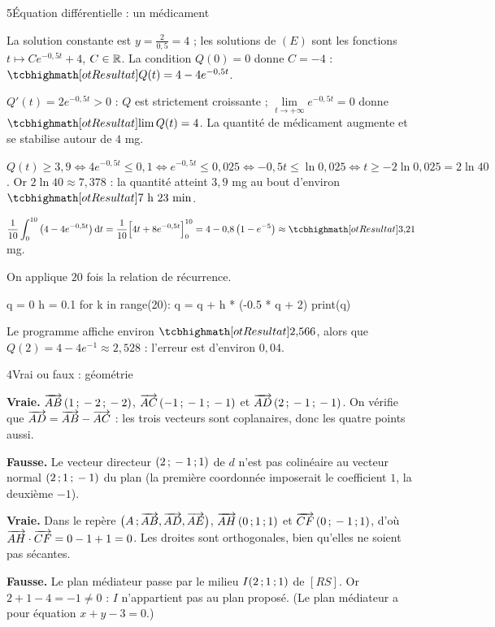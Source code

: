 \begin{corrigeBac}{5}{Équation différentielle : un médicament}
\begin{questions}
  \item La solution constante est $y=\frac{2}{0{,}5}=4$ ; les solutions de $(E)$ sont les fonctions $t\mapsto Ce^{-0{,}5t}+4$, $C\in\mathbb{R}$.
    La condition $Q(0)=0$ donne $C=-4$ : $\res{Q(t)=4-4e^{-0{,}5t}}$. 
  \item $Q'(t)=2e^{-0{,}5t}>0$ : $Q$ est strictement croissante ; $\lim\limits_{t\to+\infty}e^{-0{,}5t}=0$ donne $\res{\lim Q(t)=4}$. La
    quantité de médicament augmente et se stabilise autour de $4$ mg. 
  \item $Q(t)\geq3{,}9\iff4e^{-0{,}5t}\leq0{,}1\iff e^{-0{,}5t}\leq0{,}025\iff-0{,}5t\leq\ln0{,}025\iff t\geq-2\ln0{,}025=2\ln40$.
    Or $2\ln40\approx7{,}378$ : la quantité atteint $3{,}9$ mg au bout d'environ $\res{7\text{ h }23\text{ min}}$. \pts{1 pt}
  \item $\dfrac1{10}\displaystyle\int_0^{10}\left(4-4e^{-0{,}5t}\right)\mathrm{d}t=\dfrac1{10}\Big[4t+8e^{-0{,}5t}\Big]_0^{10}
    =4-0{,}8\left(1-e^{-5}\right)\approx\res{3{,}21}$ mg. \pts{1 pt}
  \item On applique $20$ fois la relation de récurrence.
\begin{codecote}[0.46]
\begin{pythoncol}
q = 0
h = 0.1
for k in range(20):
    q = q + h * (-0.5 * q + 2)
print(q)
\end{pythoncol}
\cote
Le programme affiche environ $\res{2{,}566}$, alors que $Q(2)=4-4e^{-1}\approx2{,}528$ : l'erreur est d'environ $0{,}04$.
\end{codecote}
    \pts{1 pt}
\end{questions}
\end{corrigeBac}

\begin{corrigeBac}{4}{Vrai ou faux : géométrie}
\begin{questions}
  \item \textbf{Vraie.} $\overrightarrow{AB}\,(1\,{;}\,-2\,{;}\,-2)$, $\overrightarrow{AC}\,(-1\,{;}\,-1\,{;}\,-1)$ et $\overrightarrow{AD}\,(2\,{;}\,-1\,{;}\,-1)$. On vérifie que
    $\overrightarrow{AD}=\overrightarrow{AB}-\overrightarrow{AC}$ : les trois vecteurs sont coplanaires, donc les quatre points aussi. \pts{1 pt}
  \item \textbf{Fausse.} Le vecteur directeur $(2\,{;}\,-1\,{;}\,1)$ de $d$ n'est pas colinéaire au vecteur normal $(2\,{;}\,1\,{;}\,-1)$ du plan
    (la première coordonnée imposerait le coefficient $1$, la deuxième $-1$). \pts{1 pt}
  \item \textbf{Vraie.} Dans le repère $\big(A\,{;}\,\overrightarrow{AB},\overrightarrow{AD},\overrightarrow{AE}\big)$, $\overrightarrow{AH}\,(0\,{;}\,1\,{;}\,1)$ et $\overrightarrow{CF}\,(0\,{;}\,-1\,{;}\,1)$, d'où
    $\overrightarrow{AH}\cdot\overrightarrow{CF}=0-1+1=0$. Les droites sont orthogonales, bien qu'elles ne soient pas sécantes. \pts{1 pt}
  \item \textbf{Fausse.} Le plan médiateur passe par le milieu $I(2\,{;}\,1\,{;}\,1)$ de $[RS]$. Or $2+1-4=-1\neq0$ : $I$ n'appartient pas au plan
    proposé. (Le plan médiateur a pour équation $x+y-3=0$.) \pts{1 pt}
\end{questions}
\end{corrigeBac}

